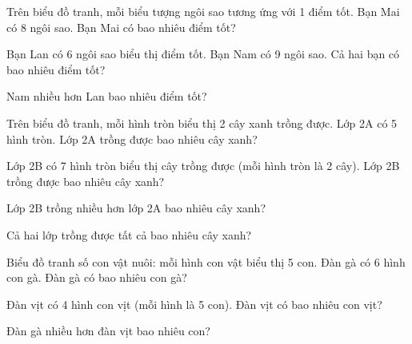 \begin{ex}
Trên biểu đồ tranh, mỗi biểu tượng ngôi sao tương ứng với 1 điểm tốt. Bạn Mai có 8 ngôi sao. Bạn Mai có bao nhiêu điểm tốt?
\end{ex}

\begin{ex}
Bạn Lan có 6 ngôi sao biểu thị điểm tốt. Bạn Nam có 9 ngôi sao. Cả hai bạn có bao nhiêu điểm tốt?
\end{ex}

\begin{ex}
Nam nhiều hơn Lan bao nhiêu điểm tốt?
\end{ex}

\begin{ex}
Trên biểu đồ tranh, mỗi hình tròn biểu thị 2 cây xanh trồng được. Lớp 2A có 5 hình tròn. Lớp 2A trồng được bao nhiêu cây xanh?
\end{ex}

\begin{ex}
Lớp 2B có 7 hình tròn biểu thị cây trồng được (mỗi hình tròn là 2 cây). Lớp 2B trồng được bao nhiêu cây xanh?
\end{ex}

\begin{ex}
Lớp 2B trồng nhiều hơn lớp 2A bao nhiêu cây xanh?
\end{ex}

\begin{ex}
Cả hai lớp trồng được tất cả bao nhiêu cây xanh?
\end{ex}

\begin{ex}
Biểu đồ tranh số con vật nuôi: mỗi hình con vật biểu thị 5 con. Đàn gà có 6 hình con gà. Đàn gà có bao nhiêu con gà?
\end{ex}

\begin{ex}
Đàn vịt có 4 hình con vịt (mỗi hình là 5 con). Đàn vịt có bao nhiêu con vịt?
\end{ex}

\begin{ex}
Đàn gà nhiều hơn đàn vịt bao nhiêu con?
\end{ex}

